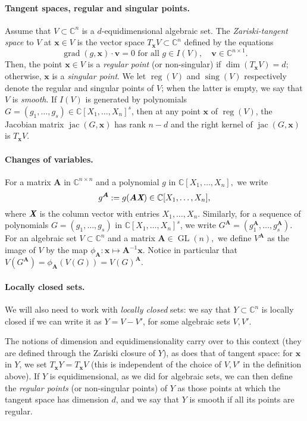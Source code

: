 \documentclass[12pt]{article}
\def\Xb{\textit{\textbf{X}}}
\def\mA{{\bm A}}
\def\xb{{\bm x}}
\DeclareMathOperator{\GL}{GL}
\DeclareMathOperator{\sing}{sing}
\DeclareMathOperator{\jac}{jac}
\DeclareMathOperator{\grad}{grad}
\DeclareMathOperator{\reg}{reg}
\def\C{\mathbb{C}}
\begin{document}
\paragraph*{Tangent spaces, regular and singular points.}
Assume that $V \subset \C^n$ is a $d$-equidimen\-sional algebraic
set. The \textit{Zariski-tangent space} to $V$ at $\xb \in V$ is the
vector space $T_{\xb}V \subset \C^n$ defined by the equations
\[
\grad (g,\xb) \cdot \bm v = 0 \text{~for all $g \in I(V)$}, \quad \bm
v \in \C^{n \times 1}.
\] 
Then, the point $\xb \in V$ is a \textit{regular point} (or
non-singular) if $\dim (T_{\xb}V) = d$; otherwise, $\xb$ is a
\textit{singular point}. We let $\reg(V)$ and $\sing(V)$ respectively
denote the regular and singular points of $V$; when the latter is
empty, we say that $V$ is \textit{smooth}. If $I(V)$ is generated by
polynomials $G=(g_1,\hdots,g_s) \in \C[X_1,\hdots,X_n]^s$, then at any
point $\xb$ of $\reg(V)$, the Jacobian matrix $\jac(G,\xb)$ has rank
$n - d$ and the right kernel of $\jac(G,\xb)$ is $T_{\xb}V.$

\paragraph*{Changes of variables.}
For a matrix $\mA$ in $\C^{n\times n}$ and a polynomial $g$ in
$\C[X_1,\hdots,X_n],$ we write \[g^\mA:=g(\mA \Xb) \in
\C[X_1,\dots,X_n],\] where $\Xb$ is the column vector with entries
$X_1,\dots,X_n$. Similarly, for a sequence of polynomials
$G=(g_1,\hdots,g_s)$ in $\C[X_1,\hdots,X_n]^s$, we write $G^{\mA} =
\left(g_1^{\mA},\hdots,g_s^{\mA}\right).$ For an algebraic set $V
\subset \C^n$ and a matrix $\mA \in \GL(n),$ we define $V^{\mA}$ as
the image of $V$ by the map $\phi_{\mA} : \xb \mapsto \mA^{-1}\xb.$
 Notice in particular that
$V(G^{\mA}) = \phi_{\mA}(V(G)) = V(G)^{\mA}. $

\paragraph*{Locally closed sets.}
We will also need to work with {\em locally closed} sets: we say that
$Y \subset \C^n$ is locally closed if we can write it as $Y=V-V'$, for
some algebraic sets $V,V'$.

The notions of dimension and equidimensionality carry over to this
context (they are defined through the Zariski closure of $Y$), as does
that of tangent space: for $\xb$ in $Y$, we set $T_\xb Y = T_\xb V$
(this is independent of the choice of $V,V'$ in the definition above).
If $Y$ is equidimensional, as we did for algebraic sets, we can then
define the {\em regular points} (or non-singular points) of $Y$ as
those points at which the tangent space has dimension $d$, and we say
that $Y$ is smooth if all its points are regular.
\end{document}
